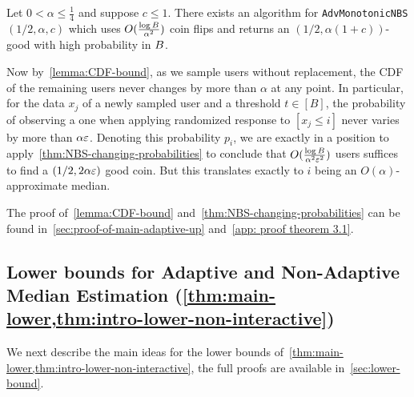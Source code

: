 %

\begin{theorem}\label{thm:NBS-changing-probabilities}
Let $0<\alpha\leq \frac{1}{4}$ and suppose $c\leq 1$. 
There exists an algorithm for \texttt{AdvMonotonicNBS}$(1/2, \alpha, c)$ which uses $O(\frac{\log B}{\alpha^2})$ coin flips and returns an $(1/2,\alpha(1+c))$-good with high probability in $B$.
\end{theorem}

Now by~\cref{lemma:CDF-bound}, as we sample users without replacement, the CDF of the remaining users never changes by more than $\alpha$ at any point. In particular, for the data $x_j$ of a newly sampled user and a threshold $t\in [B]$, the probability of observing a one when applying randomized response to $[x_j\leq i]$ never varies by more than $\alpha\varepsilon$. Denoting this probability $p_i$, we are exactly in a position to apply~\cref{thm:NBS-changing-probabilities} to conclude that $O(\frac{\log B}{\alpha^2\varepsilon^2})$ users suffices to find a $(1/2,2\alpha\varepsilon)$ good coin. But this translates exactly to $i$ being an $O(\alpha)$-approximate median.

The proof of~\cref{lemma:CDF-bound} and~\cref{thm:NBS-changing-probabilities} can be found in~\cref{sec:proof-of-main-adaptive-up} and~\cref{app: proof theorem 3.1}.


%
%
%
%



%


\subsection{Lower bounds for Adaptive and Non-Adaptive Median Estimation (\cref{thm:main-lower,thm:intro-lower-non-interactive})}
We next describe the main ideas for the lower bounds of~\cref{thm:main-lower,thm:intro-lower-non-interactive}, the full proofs are available in~\cref{sec:lower-bound}.

